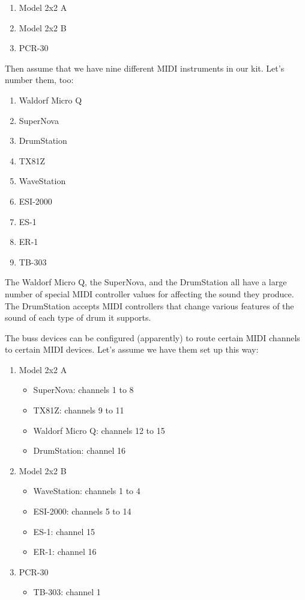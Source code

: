    \begin{enumerate}
      \item Model 2x2 A
      \item Model 2x2 B
      \item PCR-30
   \end{enumerate}

   Then assume that we have nine different MIDI instruments in our kit.
   Let's number them, too:

   \begin{enumerate}
      \item Waldorf Micro Q
      \item SuperNova
      \item DrumStation
      \item TX81Z
      \item WaveStation
      \item ESI-2000
      \item ES-1
      \item ER-1
      \item TB-303
   \end{enumerate}

   The Waldorf Micro Q, the SuperNova, and the DrumStation all have a large
   number of special MIDI controller values for affecting the sound they
   produce.  The DrumStation accepts MIDI controllers that change various
   features of the sound of each type of drum it supports.

   The buss devices can be configured (apparently) to route certain
   MIDI channels to certain MIDI devices.  Let's assume we have them
   set up this way:

   \begin{enumerate}
      \item Model 2x2 A
      \begin{itemize}
         \item SuperNova: channels 1 to 8
         \item TX81Z: channels 9 to 11
         \item Waldorf Micro Q: channels 12 to 15
         \item DrumStation: channel 16
      \end{itemize}
      \item Model 2x2 B
      \begin{itemize}
         \item WaveStation: channels 1 to 4
         \item ESI-2000: channels 5 to 14
         \item ES-1: channel 15
         \item ER-1: channel 16
      \end{itemize}
      \item PCR-30
      \begin{itemize}
         \item TB-303: channel 1
      \end{itemize}
   \end{enumerate}


